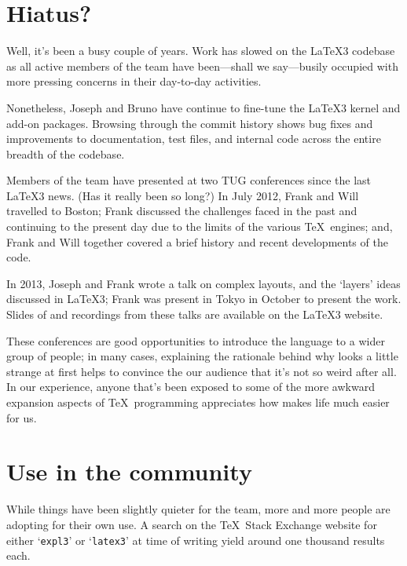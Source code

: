 \documentclass{ltnews}
\begin{document}
\maketitle

\tableofcontents

\section{Hiatus?}

Well, it's been a busy couple of years.
Work has slowed on the \LaTeX3 codebase as all active members of the team have been---shall we say---busily occupied with more pressing concerns in their day-to-day activities.

Nonetheless, Joseph and Bruno have continue to fine-tune the \LaTeX3 kernel and add-on packages.
Browsing through the commit history shows bug fixes and improvements to documentation, test files, and internal code across the entire breadth of the codebase.

Members of the team have presented at two TUG conferences since the last \LaTeX3 news. (Has it really been so long?)
In July 2012, Frank and Will travelled to Boston; Frank discussed the challenges faced in the past and continuing to the present day due to the limits of the various \TeX\ engines; and, Frank and Will together covered a brief history and recent developments of the  code.

In 2013, Joseph and Frank wrote a talk on complex layouts, and the `layers' ideas discussed in \LaTeX3; Frank was present in Tokyo in October to present the work.
Slides of and recordings from these talks are available on the \LaTeX3 website.

These conferences are good opportunities to introduce the  language to a wider group of people; in many cases, explaining the rationale behind why  looks a little strange at first helps to convince the our audience that it's not so weird after all.
In our experience, anyone that's been exposed to some of the more awkward expansion aspects of \TeX\ programming appreciates how  makes life much easier for us.

\section{Use in the community}

While things have been slightly quieter for the team, more and more people are adopting  for their own use.
A search on the \TeX\ Stack Exchange website for either `\texttt{expl3}' or `\texttt{latex3}' at time of writing yield around one thousand results each.
\end{document}
